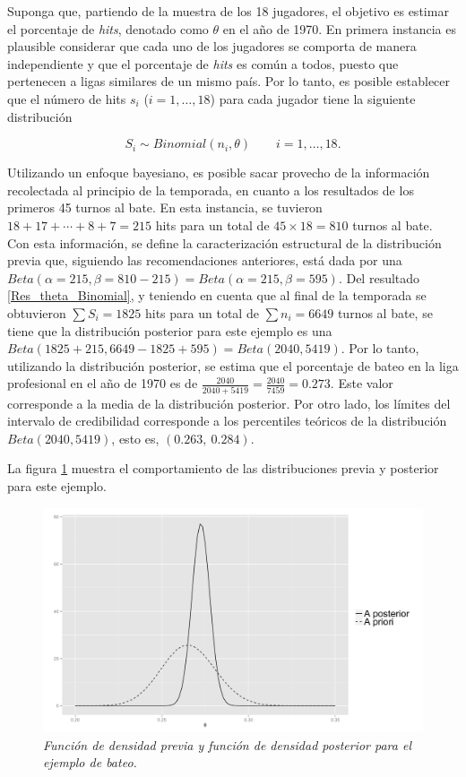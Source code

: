 \documentclass[10pt,openright]{book}\usepackage[]{graphicx}\usepackage[]{color}
\begin{document}
\begin{Eje}
    Suponga que, partiendo de la muestra de los 18 jugadores, el objetivo es estimar el porcentaje de \emph{hits}, denotado como $\theta$ en el a\~no de 1970. En primera instancia es plausible considerar que cada uno de los jugadores se comporta de manera independiente y que el porcentaje de \emph{hits} es com\'un a todos, puesto que pertenecen a ligas similares de un mismo pa\'is. Por lo tanto, es posible establecer que el n\'umero de hits $s_i$ ($i=1,\ldots,18$) para cada jugador tiene la siguiente distribuci\'on
    
    \begin{equation*}
    S_i\sim Binomial (n_i,\theta) \ \ \ \ \ \ \ \ \ i=1,\ldots,18.
    \end{equation*}
    
    Utilizando un enfoque bayesiano, es posible sacar provecho de la informaci\'on recolectada al principio de la temporada, en cuanto a los resultados de los primeros 45 turnos al bate. En esta instancia, se tuvieron $18+17+\cdots+8+7=215$ hits para un total de $45\times 18= 810$ turnos al bate. Con esta informaci\'on, se define la caracterizaci\'on estructural de la distribuci\'on previa que, siguiendo las recomendaciones anteriores, est\'a dada por una $Beta(\alpha=215, \beta=810-215)=Beta(\alpha=215, \beta=595)$. Del resultado \ref{Res_theta_Binomial}, y teniendo en cuenta que al final de la temporada se obtuvieron $\sum S_i =1825$ hits para un total de $\sum n_i =6649$ turnos al bate, se tiene que la distribuci\'on posterior para este ejemplo es una $Beta(1825+215,6649-1825+595)=Beta(2040, 5419)$. Por lo tanto, utilizando la distribuci\'on posterior, se estima que el porcentaje de bateo en la liga profesional en el a\~no de 1970 es de $\frac{2040}{2040+5419}=\frac{2040}{7459}=0.273$. Este valor corresponde a la media de la distribuci\'on posterior. Por otro lado, los l\'imites del intervalo de credibilidad corresponde a los percentiles te\'oricos de la distribuci\'on $Beta(2040, 5419)$, esto es, $(0.263,\ 0.284)$.
    
    
La figura \ref{BinomEj1} muestra el comportamiento de las distribuciones previa y posterior para este ejemplo. 
  
    \begin{figure}[!h]
    \centering
    \includegraphics[scale=0.4]{BinomEj1.pdf}
    \caption{\emph{Funci\'on de densidad previa y funci\'on de densidad posterior para el ejemplo de bateo.}}
    \label{BinomEj1}
    \end{figure}
    

\end{Eje}
\end{document}
